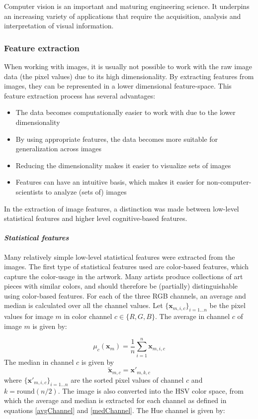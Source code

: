 Computer vision is an important and maturing engineering science. It underpins an increasing variety of applications that require the acquisition, analysis and interpretation of visual information.

\subsubsection{Feature extraction}
When working with images, it is usually not possible to work with the raw image data (the pixel values) due to its high dimensionality. 
By extracting features from images, they can be represented in a lower dimensional feature-space.  This feature extraction process has several advantages:
\begin{itemize}
\item The data becomes computationally easier to work with due to the lower dimensionality
\item By using appropriate features, the data becomes more suitable for generalization across images
\item Reducing the dimensionality makes it easier to visualize sets of images
\item Features can have an intuitive basis, which makes it easier for non-computer-scientists to analyze (sets of) images
\end{itemize}

In the extraction of image features, a distinction was made between low-level statistical features and higher level cognitive-based features.\\

\paragraph{\textit{Statistical features}}
Many relatively simple low-level statistical features were extracted from the images.
The first type of statistical features used are color-based features, which capture the color-usage in the artwork. Many artists produce collections of art pieces with similar colors, and should therefore be (partially) distinguishable using color-based features. For each of the three RGB channels, an average and median is calculated over all the channel values. Let $\{\mathbf{x}_{m,i,c} \}_{i=1\dots n}$ be the pixel values for image $m$ in color channel $c \in \{R,G,B \}$. The average in channel $c$ of image $m$ is given by: 

\begin{equation}
\label{avgChannel}
\mu_c(\mathbf{x}_{m}) = \frac{1}{n}\sum_{i=1}^{n} \mathbf{x}_{m,i,c} 
\end{equation}
The median in channel $c$ is given by 
\begin{equation}
\label{medChannel}
\tilde{\mathbf{x}}_{m,c} = \mathbf{x'}_{m,k,c}
\end{equation}
where $\{\mathbf{x'}_{m,i,c}\}_{i = 1\dots n}$ are the sorted pixel values of channel $c$ and $k = \mbox{round}(n/2)$.
The image is also converted into the HSV color space, from which the average and median is extracted for each channel as defined in equations \ref{avgChannel} and \ref{medChannel}. The Hue channel is given by: \\\\

